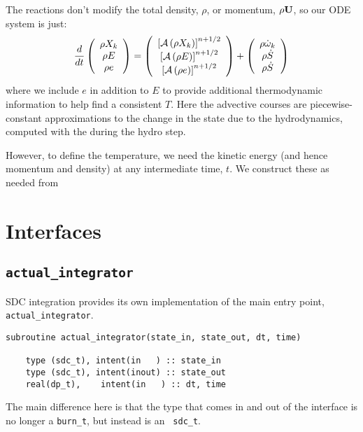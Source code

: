 The reactions don't modify the total density, $\rho$, or momentum,
$\rho {\bf U}$, so our ODE system is just:
\begin{equation}
\frac{d}{dt}\left ( 
   \begin{array}{c} \rho X_k \\ \rho E \\  \rho e \end{array} 
\right ) = 
\left ( \begin{array}{c}
   {\left [\mathcal{A} \left(\rho X_k\right)\right]}^{n+1/2} \\ {\left [\mathcal{A} \left(\rho E\right)\right]}^{n+1/2} \\ {\left [\mathcal{A} \left(\rho e\right)\right]}^{n+1/2} \\
\end{array} \right ) +
\left (
   \begin{array}{c} \rho \dot{\omega}_k \\ \rho \dot{S} \\ \rho \dot{S} \end{array}
\right )
\end{equation}
where we include $e$ in addition to $E$ to provide additional thermodynamic 
information to help find a consistent $T$.  Here the advective courses
are piecewise-constant approximations to the change in the state due
to the hydrodynamics, computed with the during the hydro step.

However, to define the temperature, we need the kinetic energy (and
hence momentum and density) at any intermediate time, $t$.  We construct
these as needed from 


\section{Interfaces}

\subsection{{\tt actual\_integrator}}

SDC integration provides its own implementation of the main entry
point, {\tt actual\_integrator}.
\begin{lstlisting}[language={[95]fortran}]
  subroutine actual_integrator(state_in, state_out, dt, time)

    type (sdc_t), intent(in   ) :: state_in
    type (sdc_t), intent(inout) :: state_out
    real(dp_t),    intent(in   ) :: dt, time
\end{lstlisting}
The main difference here is that the type that comes in and out of the
interface is no longer a {\tt burn\_t}, but instead is an {\tt
  sdc\_t}.

